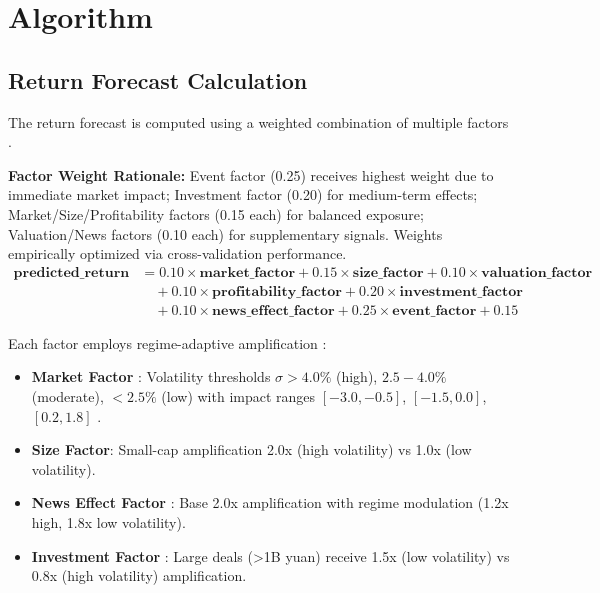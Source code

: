 \documentclass[3p,times,procedia]{elsarticle}
\begin{document}
\section{Algorithm}
\vspace{-3pt}
\subsection{Return Forecast Calculation}
The return forecast is computed using a weighted combination of multiple factors \cite{FAMA1993}.

\textbf{Factor Weight Rationale:} Event factor (0.25) receives highest weight due to immediate market impact; Investment factor (0.20) for medium-term effects; Market/Size/Profitability factors (0.15 each) for balanced exposure; Valuation/News factors (0.10 each) for supplementary signals. Weights empirically optimized via cross-validation performance.
\begin{align}
\mathbf{predicted\_return} &= 0.10 \times \mathbf{market\_factor} + 0.15 \times \mathbf{size\_factor} + 0.10 \times \mathbf{valuation\_factor} \nonumber \\
&\quad + 0.10 \times \mathbf{profitability\_factor} + 0.20 \times \mathbf{investment\_factor} \nonumber \\
&\quad + 0.10 \times \mathbf{news\_effect\_factor} + 0.25 \times \mathbf{event\_factor} + 0.15
\end{align}

Each factor employs regime-adaptive amplification \cite{Carhart1997}:

\begin{itemize}\setlength{\itemsep}{2pt}
\item \textbf{Market Factor} \cite{FAMA1993}: Volatility thresholds $\sigma > 4.0\%$ (high), $2.5-4.0\%$ (moderate), $<2.5\%$ (low) with impact ranges $[-3.0, -0.5]$, $[-1.5, 0.0]$, $[0.2, 1.8]$ \cite{Nelson1991}.

\item \textbf{Size Factor}: Small-cap amplification 2.0x (high volatility) vs 1.0x (low volatility).

\item \textbf{News Effect Factor} \cite{TETLOCK2007}: Base 2.0x amplification with regime modulation (1.2x high, 1.8x low volatility).

\item \textbf{Investment Factor} \cite{Daniel1998}: Large deals (>1B yuan) receive 1.5x (low volatility) vs 0.8x (high volatility) amplification.
\end{itemize}
\end{document}
